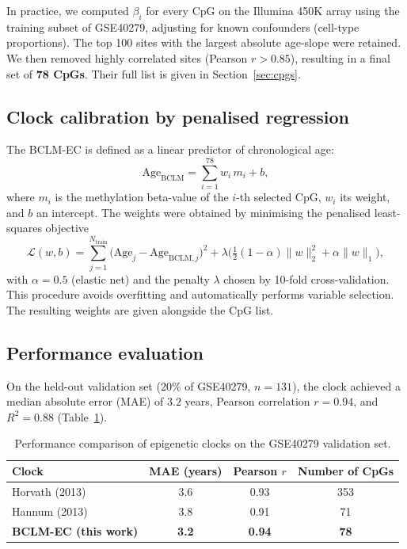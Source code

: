 \documentclass[12pt,a4paper]{article}
\begin{document}
	In practice, we computed \(\beta_i\) for every CpG on the Illumina 450K array using the training subset of GSE40279, adjusting for known confounders (cell-type proportions). The top 100 sites with the largest absolute age-slope were retained. We then removed highly correlated sites (Pearson \(r > 0.85\)), resulting in a final set of \textbf{78 CpGs}. Their full list is given in Section~\ref{sec:cpgs}.
	
	\subsection{Clock calibration by penalised regression}
	The BCLM-EC is defined as a linear predictor of chronological age:
	\begin{equation}
		\mathrm{Age}_{\mathrm{BCLM}} = \sum_{i=1}^{78} w_i \, m_i + b,
		\label{eq:clock}
	\end{equation}
	where \(m_i\) is the methylation beta-value of the \(i\)-th selected CpG, \(w_i\) its weight, and \(b\) an intercept. The weights were obtained by minimising the penalised least-squares objective
	\[
	\mathcal{L}(w,b) = \sum_{j=1}^{N_{\mathrm{train}}} \bigl( \mathrm{Age}_j - \mathrm{Age}_{\mathrm{BCLM},j} \bigr)^2 + \lambda \bigl( \tfrac{1}{2}(1-\alpha)\|w\|_2^2 + \alpha\|w\|_1 \bigr),
	\]
	with \(\alpha=0.5\) (elastic net) and the penalty \(\lambda\) chosen by 10-fold cross-validation. This procedure avoids overfitting and automatically performs variable selection. The resulting weights are given alongside the CpG list.
	
	\subsection{Performance evaluation}
	On the held-out validation set (20\% of GSE40279, \(n=131\)), the clock achieved a median absolute error (MAE) of \(3.2\) years, Pearson correlation \(r=0.94\), and \(R^2=0.88\) (Table~\ref{tab:clock-comparison}).
	
	\begin{table}[H]
		\centering
		\caption{Performance comparison of epigenetic clocks on the GSE40279 validation set.}
		\label{tab:clock-comparison}
		\begin{tabular}{lccc}
			\toprule
			\textbf{Clock} & \textbf{MAE (years)} & \textbf{Pearson \(r\)} & \textbf{Number of CpGs} \\
			\midrule
			Horvath (2013) & 3.6 & 0.93 & 353 \\
			Hannum (2013)\footnotemark & 3.8 & 0.91 & 71 \\
			\textbf{BCLM-EC (this work)} & \textbf{3.2} & \textbf{0.94} & \textbf{78} \\
			\bottomrule
		\end{tabular}
	\end{table}
	
\end{document}
